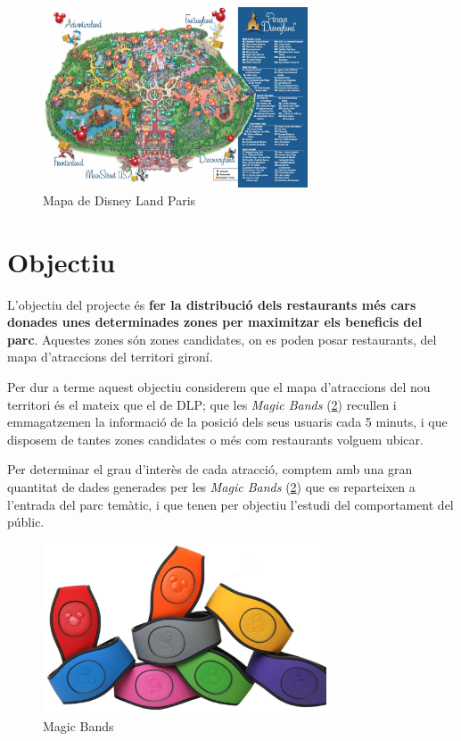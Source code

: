 \documentclass[12pt]{article}
\begin{document}
\begin{figure}[h!]
    \centering
    \includegraphics[width=0.70\textwidth]{imatges/mapa_disney_land_paris.jpg}\par\vspace{1cm}
    \caption{Mapa de Disney Land Paris}
    \label{fig:disney1}
\end{figure}

\clearpage
\section{Objectiu}
L'objectiu del projecte és \textbf{fer la distribució dels restaurants més cars donades unes determinades zones per maximitzar els beneficis del parc}. Aquestes zones són zones candidates, on es poden posar restaurants, del mapa d'atraccions del territori gironí.

Per dur a terme aquest objectiu considerem que el mapa d'atraccions del nou territori és el mateix que el de DLP; que les \textit{Magic Bands} (\ref{fig:magic_bands}) recullen i emmagatzemen la informació de la posició dels seus usuaris cada 5 minuts, i que disposem de tantes zones candidates o més com restaurants volguem ubicar. 

Per determinar el grau d'interès de cada atracció, comptem amb una gran quantitat de dades generades per les \textit{Magic Bands} (\ref{fig:magic_bands}) que es reparteixen a l'entrada del parc temàtic, i que tenen per objectiu l'estudi del comportament del públic. 

\begin{figure}[h]
    \centering
    \includegraphics[width=0.75\textwidth]{imatges/magic_bands.jpg}\par\vspace{1cm}
    \caption{Magic Bands}
    \label{fig:magic_bands}
\end{figure}
\end{document}
